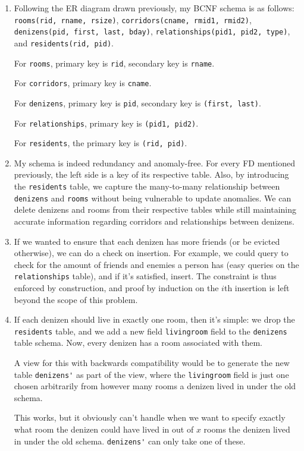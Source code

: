 \documentclass{article}
\begin{document}
\begin{enumerate}[resume]
	\item Following the ER diagram drawn previously, my BCNF schema is as follows: \verb|rooms(rid, rname, rsize)|, \verb|corridors(cname, rmid1, rmid2)|, \verb|denizens(pid, first, last, bday)|, \verb|relationships(pid1, pid2, type)|, and \verb|residents(rid, pid)|.

	For \verb|rooms|, primary key is \verb|rid|, secondary key is \verb|rname|.

	For \verb|corridors|, primary key is \verb|cname|.

	For \verb|denizens|, primary key is \verb|pid|, secondary key is \verb|(first, last)|.

	For \verb|relationships|, primary key is \verb|(pid1, pid2)|.

    For \verb|residents|, the primary key is \verb|(rid, pid)|.

    \item My schema is indeed redundancy and anomaly-free. For every FD mentioned previously, the left side is a key of its respective table. Also, by introducing the \verb|residents| table, we capture the many-to-many relationship between \verb|denizens| and \verb|rooms| without being vulnerable to update anomalies. We can delete denizens and rooms from their respective tables while still maintaining accurate information regarding corridors and relationships between denizens.

    \item If we wanted to ensure that each denizen has more friends (or be evicted otherwise), we can do a check on insertion. For example, we could query to check for the amount of friends and enemies a person has (easy queries on the \verb|relationships| table), and if it's satisfied, insert. The constraint is thus enforced by construction, and proof by induction on the $i$th insertion is left beyond the scope of this problem.

    \item If each denizen should live in exactly one room, then it's simple: we drop the \verb|residents| table, and we add a new field \verb|livingroom| field to the \verb|denizens| table schema. Now, every denizen has a room associated with them.

    A view for this with backwards compatibility would be to generate the new table \verb|denizens'| as part of the view, where the \verb|livingroom| field is just one chosen arbitrarily from however many rooms a denizen lived in under the old schema.

    This works, but it obviously can't handle when we want to specify exactly what room the denizen could have lived in out of $x$ rooms the denizen lived in under the old schema. \verb|denizens'| can only take one of these.

\end{enumerate}
\end{document}
